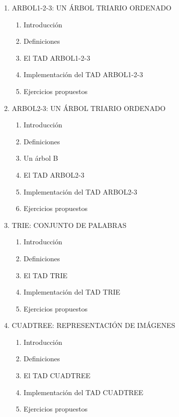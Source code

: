 \begin{enumerate}
	\item \textsc{ARBOL1-2-3: UN ÁRBOL TRIARIO ORDENADO}
	\begin{enumerate}
		\item Introducción
		\item Definiciones
		\item El TAD ARBOL1-2-3
		\item Implementación del TAD ARBOL1-2-3
		\item Ejercicios propuestos
	\end{enumerate}			
	
	\item \textsc{ARBOL2-3: UN ÁRBOL TRIARIO ORDENADO}
	\begin{enumerate}
		\item Introducción
		\item Definiciones
		\item Un árbol B 
		\item El TAD ARBOL2-3
		\item Implementación del TAD ARBOL2-3
		\item Ejercicios propuestos
	\end{enumerate}
	
	\item \textsc{TRIE: CONJUNTO DE PALABRAS}
	\begin{enumerate}
		\item Introducción
		\item Definiciones
		\item El TAD TRIE
		\item Implementación del TAD TRIE
		\item Ejercicios propuestos
	\end{enumerate}	
	
	\item \textsc{CUADTREE: REPRESENTACIÓN DE IMÁGENES}
	\begin{enumerate}
		\item Introducción
		\item Definiciones
		\item El TAD CUADTREE
		\item Implementación del TAD CUADTREE
		\item Ejercicios propuestos
	\end{enumerate}	
	

\end{enumerate}
